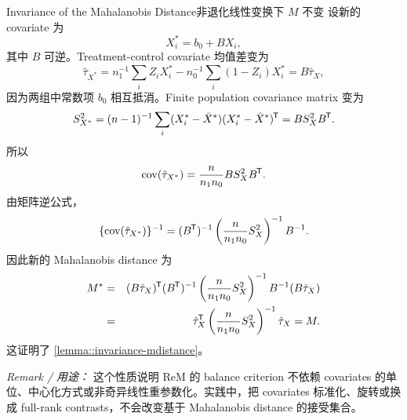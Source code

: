 \begin{exercisesolution}{Invariance of the Mahalanobis Distance}{非退化线性变换下 $M$ 不变}
设新的 covariate 为
\[
X_i^\ast=b_0+BX_i,
\]
其中 $B$ 可逆。Treatment-control covariate 均值差变为
\[
\hat{\tau}_{X^\ast}
=n_1^{-1}\sum_i Z_iX_i^\ast-n_0^{-1}\sum_i(1-Z_i)X_i^\ast
=B\hat{\tau}_X,
\]
因为两组中常数项 $b_0$ 相互抵消。Finite population covariance matrix 变为
\[
S_{X^\ast}^2
=(n-1)^{-1}\sum_i(X_i^\ast-\bar X^\ast)(X_i^\ast-\bar X^\ast)^{\mkern-1.5mu\mathsf{T}}
=BS_X^2B^{\mkern-1.5mu\mathsf{T}}.
\]
所以
\[
\textup{cov}(\hat{\tau}_{X^\ast})
=\frac{n}{n_1n_0}BS_X^2B^{\mkern-1.5mu\mathsf{T}}.
\]
由矩阵逆公式，
\[
\{\textup{cov}(\hat{\tau}_{X^\ast})\}^{-1}
=(B^{\mkern-1.5mu\mathsf{T}})^{-1}\left(\frac{n}{n_1n_0}S_X^2\right)^{-1}B^{-1}.
\]
因此新的 Mahalanobis distance 为
\begin{eqnarray*}
M^\ast
&=&(B\hat{\tau}_X)^{\mkern-1.5mu\mathsf{T}}
(B^{\mkern-1.5mu\mathsf{T}})^{-1}\left(\frac{n}{n_1n_0}S_X^2\right)^{-1}B^{-1}
(B\hat{\tau}_X)\\
&=&\hat{\tau}_X^{\mkern-1.5mu\mathsf{T}}
\left(\frac{n}{n_1n_0}S_X^2\right)^{-1}
\hat{\tau}_X
=M.
\end{eqnarray*}
这证明了 \cref{lemma::invariance-mdistance}。

\emph{Remark / 用途：} 这个性质说明 ReM 的 balance criterion 不依赖 covariates 的单位、中心化方式或非奇异线性重参数化。实践中，把 covariates 标准化、旋转或换成 full-rank contrasts，不会改变基于 Mahalanobis distance 的接受集合。
\end{exercisesolution}


